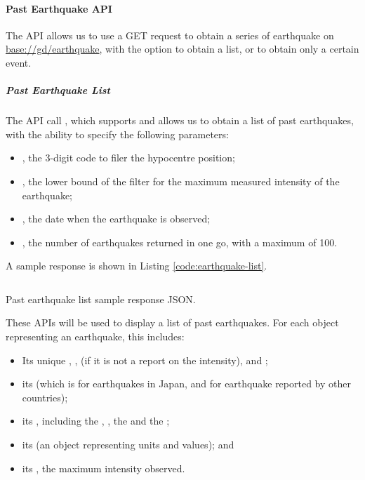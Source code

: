 
\paragraph{Past Earthquake API}

The API  allows us to use a GET request to obtain a series of earthquake on \url{base://gd/earthquake}, with the option to obtain a list, or to obtain only a certain event.

\subparagraph{Past Earthquake List} The API call , which supports  and  allows us to obtain a list of past earthquakes, with the ability to specify the following parameters:
\begin{itemize}
    \item {}, the 3-digit code to filer the hypocentre position;
    \item {}, the lower bound of the filter for the maximum measured intensity of the earthquake;
    \item {}, the date when the earthquake is observed;
    \item {}, the number of earthquakes returned in one go, with a maximum of 100.
\end{itemize}

A sample response is shown in Listing \ref{code:earthquake-list}.

\begin{listing}[htp]
    \inputminted{json}{code/GdEarthquakeList.json}
    \caption{Past earthquake list sample response JSON.}
    \label{code:earthquake-list}
\end{listing}

These APIs will be used to display a list of past earthquakes. For each object representing an earthquake, this includes:
\begin{itemize}
    \item Its unique , ,  (if it is not a report on the intensity), and ;
    \item its  (which is  for earthquakes in Japan, and  for earthquake reported by other countries);
    \item its , including the , , the  and the ;
    \item its  (an object representing units and values); and
    \item its , the maximum intensity observed.
\end{itemize}

